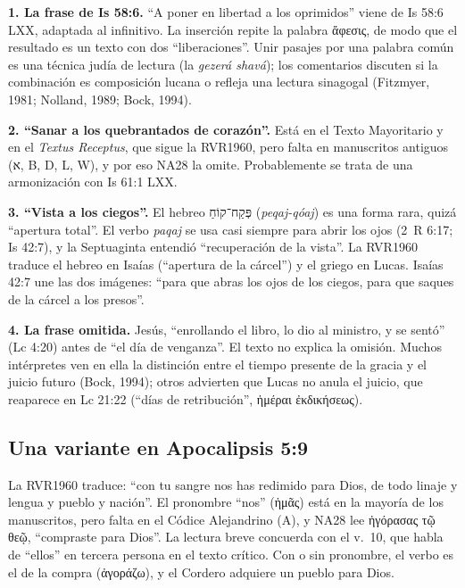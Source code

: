 \documentclass[11pt,letterpaper]{article}
\newcommand{\heb}[1]{\mbox{\foreignlanguage{hebrew}{#1}}}
\newcommand{\grc}[1]{\foreignlanguage{ancientgreek}{#1}}
\begin{document}
\begin{nota}
\textbf{1. La frase de Is 58:6.} ``A poner en libertad a los oprimidos'' viene de Is 58:6 LXX, adaptada al infinitivo. La inserción repite la palabra \grc{ἄφεσις}, de modo que el resultado es un texto con dos ``liberaciones''. Unir pasajes por una palabra común es una técnica judía de lectura (la \emph{gezerá shavá}); los comentarios discuten si la combinación es composición lucana o refleja una lectura sinagogal (Fitzmyer, 1981; Nolland, 1989; Bock, 1994).

\textbf{2. ``Sanar a los quebrantados de corazón''.} Está en el Texto Mayoritario y en el \emph{Textus Receptus}, que sigue la RVR1960, pero falta en manuscritos antiguos (\heb{א}, B, D, L, W), y por eso NA28 la omite. Probablemente se trata de una armonización con Is 61:1 LXX.

\textbf{3. ``Vista a los ciegos''.} El hebreo \heb{פְּקַח־קוֹחַ} (\emph{peqaj-qóaj}) es una forma rara, quizá ``apertura total''. El verbo \emph{paqaj} se usa casi siempre para abrir los ojos (2~R 6:17; Is 42:7), y la Septuaginta entendió ``recuperación de la vista''. La RVR1960 traduce el hebreo en Isaías (``apertura de la cárcel'') y el griego en Lucas. Isaías 42:7 une las dos imágenes: ``para que abras los ojos de los ciegos, para que saques de la cárcel a los presos''.

\textbf{4. La frase omitida.} Jesús, ``enrollando el libro, lo dio al ministro, y se sentó'' (Lc 4:20) antes de ``el día de venganza''. El texto no explica la omisión. Muchos intérpretes ven en ella la distinción entre el tiempo presente de la gracia y el juicio futuro (Bock, 1994); otros advierten que Lucas no anula el juicio, que reaparece en Lc 21:22 (``días de retribución'', \grc{ἡμέραι ἐκδικήσεως}).
\end{nota}

\subsection{Una variante en Apocalipsis 5:9}
La RVR1960 traduce: ``con tu sangre nos has redimido para Dios, de todo linaje y lengua y pueblo y nación''. El pronombre ``nos'' (\grc{ἡμᾶς}) está en la mayoría de los manuscritos, pero falta en el Códice Alejandrino (A), y NA28 lee \grc{ἠγόρασας τῷ θεῷ}, ``compraste para Dios''. La lectura breve concuerda con el v.~10, que habla de ``ellos'' en tercera persona en el texto crítico. Con o sin pronombre, el verbo es el de la compra (\grc{ἀγοράζω}), y el Cordero adquiere un pueblo para Dios.
\end{document}
